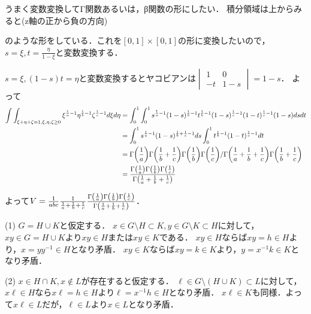 \documentclass[
		book,
		head_space=20mm,
		foot_space=20mm,
		gutter=10mm,
		line_length=190mm
]{jlreq}
\begin{document}
\begin{tcolorbox}[blanker,breakable,
    left=3mm,right=3mm,
    top=3mm,bottom=3mm,
    before skip=15pt,after skip=15pt,
    borderline vertical={1pt}{0pt}{black,dotted}]
    うまく変数変換してΓ関数あるいは，β関数の形にしたい．
積分領域は上からみると(z軸の正から負の方向)
のような形をしている．これを$[0,1]\times[0,1]$の形に変換したいので，$s=\xi,t=\frac{\eta}{1-\xi}$と変数変換する．
\end{tcolorbox}
$s=\xi,(1-s)t=\eta$と変数変換するとヤコビアンは$\begin{vmatrix}
    1 & 0 \\
    -t & 1-s
\end{vmatrix}=1-s$．
よって\begin{align}\int\int_{\xi+\eta+\zeta=1,\xi,\eta,\zeta\ge0} \xi^{\frac{1}{a}-1}\eta^{\frac{1}{b}-1}\zeta^{\frac{1}{c}-1} d\xi d\eta&=\int_0^1 \int_0^1 s^{\frac{1}{a}-1}(1-s)^{\frac{1}{b}-1}t^{\frac{1}{b}-1}(1-s)^{\frac{1}{c}-1}(1-t)^{{\frac{1}{c}-1}}(1-s)dsdt \\
    &=\int_0^1 s^{\frac{1}{a}-1}(1-s)^{\frac{1}{b}+\frac{1}{c}-1}ds\int_0^1 t^{\frac{1}{b}-1}(1-t)^{\frac{1}{c}-1}dt \\
    &=\Gamma\qty(\frac{1}{a})\Gamma\qty(\frac{1}{b}+\frac{1}{c})\Gamma\qty(\frac{1}{b})\Gamma\qty(\frac{1}{c})/ \Gamma\qty(\frac{1}{a}+\frac{1}{b}+\frac{1}{c})\Gamma\qty(\frac{1}{b}+\frac{1}{c})\\
    &=\frac{\Gamma\qty(\frac{1}{a})\Gamma\qty(\frac{1}{b})\Gamma\qty(\frac{1}{c})}{\Gamma\qty(\frac{1}{a}+\frac{1}{b}+\frac{1}{c})} 
\end{align}

よって$V=\frac{1}{abc}\frac{1}{\frac{1}{a}+\frac{1}{b}+\frac{1}{c}}\frac{\Gamma\qty(\frac{1}{a})\Gamma\qty(\frac{1}{b})\Gamma\qty(\frac{1}{c})}{\Gamma\qty(\frac{1}{a}+\frac{1}{b}+\frac{1}{c})}$．

(1) $G=H\cup K$と仮定する．
$x\in G\setminus H\subset K,y\in G\setminus K\subset H$に対して，$xy \in G = H \cup K$より$xy \in H$または$xy \in K$である．
$xy \in H$ならば$xy=h\in H$より，$x=yy^{-1}\in H$となり矛盾．
$xy \in K$ならば$xy=k\in K$より，$y=x^{-1}k\in K$となり矛盾．

(2) $x \in H\cap K, x \notin L$が存在すると仮定する．
$\ell \in G\setminus (H \cup K) \subset L$に対して，$x\ell \in H$なら$x\ell=h\in H$より$\ell=x^{-1}h\in H$となり矛盾．
$x\ell \in K$も同様．よって$x\ell \in L$だが，$\ell \in L$より$x\in L$となり矛盾．
\end{document}
